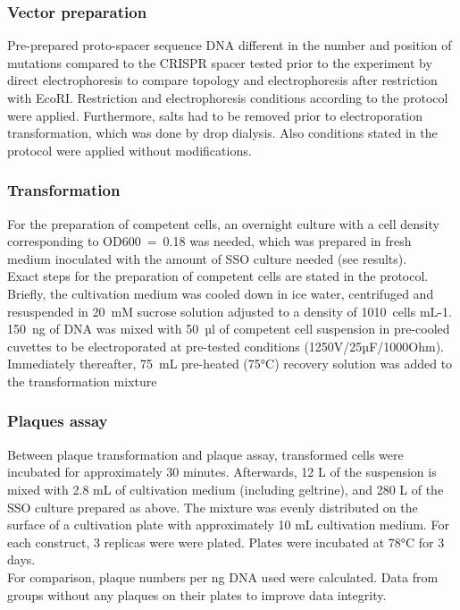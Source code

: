\documentclass[a4paper,10pt]{article}
\begin{document}
\subsubsection{Vector preparation}
Pre-prepared proto-spacer sequence DNA different in the number and position of mutations compared to the CRISPR spacer tested prior to the experiment by direct electrophoresis to compare topology and electrophoresis after restriction with EcoRI. Restriction and electrophoresis conditions according to the protocol were applied. Furthermore, salts had to be removed prior to electroporation transformation, which was done by drop dialysis. Also conditions stated in the protocol were applied without modifications.

\subsubsection{Transformation}
For the preparation of competent cells, an overnight culture with a cell density corresponding to OD600 = 0.18 was needed, which was prepared in fresh medium inoculated with the amount of SSO culture needed (see results). 
\\Exact steps for the preparation of competent cells are stated in the protocol. Briefly, the cultivation medium was cooled down in ice water, centrifuged and resuspended in 20 mM sucrose solution adjusted to a density of 1010 cells mL-1. 
\\150 ng of DNA was mixed with 50 µl of competent cell suspension in pre-cooled cuvettes to be electroporated at pre-tested conditions (1250V/25µF/1000Ohm). Immediately thereafter, 75 mL pre-heated (75°C) recovery solution was added to the transformation mixture

\subsubsection{Plaques assay}
Between plaque transformation and plaque assay, transformed cells were incubated for approximately 30 minutes. Afterwards, 12 \textmu L of the suspension is mixed with 2.8 mL of cultivation medium (including geltrine), and 280 \textmu L of the SSO culture prepared as above. The mixture was evenly distributed on the surface of a cultivation plate with approximately 10 mL cultivation medium. For each construct, 3 replicas were were plated. Plates were incubated at 78°C for 3 days.
\\For comparison, plaque numbers per ng DNA used were calculated. Data from groups without any plaques on their plates to improve data integrity. 
\end{document}
